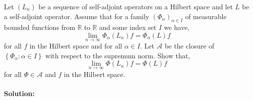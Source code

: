 Let $(L_{n})$ be a sequence of self-adjoint operators on a Hilbert space and let $L$ be a self-adjoint operator. Assume that for a family $(\Phi_{\alpha})_{\alpha\in I}$ of measurable bounded functions from $\mathbb{R}$ to $\mathbb{R}$ and some index set $I$ we have,
\begin{equation*}
	\lim_{n\to\infty}\Phi_{\alpha}(L_{n})f = \Phi_{\alpha}(L)f
\end{equation*}
for all $f$ in the Hilbert space and for all $\alpha\in I$. Let $\mathcal{A}$ be the closure of $\left\{\Phi_{\alpha}\colon \alpha\in I\right\}$ with respect to the supremum norm. Show that,
\begin{equation*}
	\lim_{n\to\infty}\Phi(L_{n})f = \Phi(L)f
\end{equation*}
for all $\Phi\in\mathcal{A}$ and $f$ in the Hilbert space.

\paragraph{Solution:}

